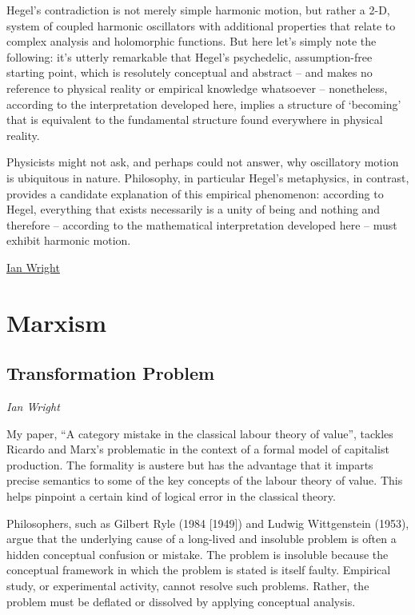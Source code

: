\documentclass[
]{book}
\begin{document}
Hegel's contradiction is not merely simple harmonic motion, but rather a 2-D, system of coupled harmonic oscillators with additional properties that relate to complex analysis and holomorphic functions. But here let's simply note the following: it's utterly remarkable that Hegel's psychedelic, assumption-free starting point, which is resolutely conceptual and abstract -- and makes no reference to physical reality or empirical knowledge whatsoever -- nonetheless, according to the interpretation developed here, implies a structure of `becoming' that is equivalent to the fundamental structure found everywhere in physical reality.

Physicists might not ask, and perhaps could not answer, why oscillatory motion is ubiquitous in nature. Philosophy, in particular Hegel's metaphysics, in contrast, provides a candidate explanation of this empirical phenomenon: according to Hegel, everything that exists necessarily is a unity of being and nothing and therefore -- according to the mathematical interpretation developed here -- must exhibit harmonic motion.

\href{https://ianwrightsite.wordpress.com/2018/10/14/notes-on-a-mathematical-interpretation-of-the-opening-of-hegels-science-of-logic/}{Ian Wright}

\hypertarget{marxism}{%
\chapter{Marxism}\label{marxism}}

\hypertarget{transformation-problem}{%
\section{Transformation Problem}\label{transformation-problem}}

\emph{Ian Wright}

My paper, ``A category mistake in the classical labour theory of value'', tackles Ricardo and Marx's problematic in the context of a formal model of capitalist production. The formality is austere but has the advantage that it imparts precise semantics to some of the key concepts of the labour theory of value. This helps pinpoint a certain kind of logical error in the classical theory.

Philosophers, such as Gilbert Ryle (1984 {[}1949{]}) and Ludwig Wittgenstein (1953), argue that the underlying cause of a long-lived and insoluble problem is often a hidden conceptual confusion or mistake. The problem is insoluble because the conceptual framework in which the problem is stated is itself faulty. Empirical study, or experimental activity, cannot resolve such problems. Rather, the problem must be deflated or dissolved by applying conceptual analysis.
\end{document}
